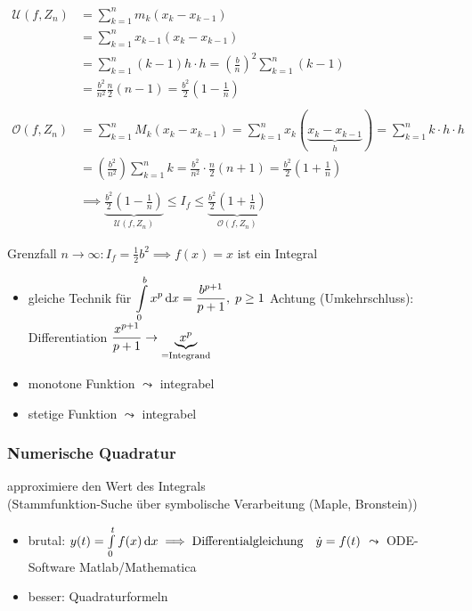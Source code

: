 \begin{align*}
	\mathcal U(f,Z_n) 
	&= \sum_{k=1}^n m_k(x_k-x_{k-1}) \\
	&= \sum_{k=1}^n x_{k-1}(x_k-x_{k-1}) \\
	&= \sum_{k=1}^n (k-1)h \cdot h = \left( \frac{b}{n} \right)^2 \sum_{k=1}^n (k-1) \\
	&= \frac{b^2}{n^2} \frac{n}{2}(n-1) = \frac{b^2}{2}\left(1-\frac{1}{n}\right) \\
	\\
	\mathcal O(f,Z_n)
	&=\sum_{k=1}^n M_k(x_k-x_{k-1}) = \sum_{k=1}^n x_k(\underbrace{x_k-x_{k-1}}_{h}) = \sum_{k=1}^n k \cdot h \cdot h \\
	&= \left(\frac{b^2}{n^2}\right)\sum_{k=1}^n k = \frac{b^2}{n^2} \cdot \frac{n}{2}(n+1) = \frac{b^2}{2}\left(1+\frac{1}{n}\right) \\
	\\
	&\implies \underbrace{ \frac{b^2}{2}\left(1-\frac{1}{n}\right) }_{\mathcal U(f,Z_n)}\leq I_f \leq \underbrace{\frac{b^2}{2}\left(1+\frac{1}{n}\right)}_{\mathcal O(f,Z_n)}
\end{align*}

\noindent Grenzfall \( n \rightarrow \infty : I_f = \frac{1}{2}b^2 \implies f(x) = x \) ist ein Integral

\begin{note}
	\begin{itemize}
		\item gleiche Technik für \( \displaystyle\int\limits_0^b x^p\,\mathrm{d}x= \frac{b^{p+1}}{p+1}, \;p \geq 1 \)
		\newline Achtung (Umkehrschluss): Differentiation \( \displaystyle\frac{x^{p+1}}{p+1} \rightarrow \underbrace{x^p}_{=\text{Integrand}} \)
		\item monotone Funktion \( \leadsto \) integrabel
		\item stetige Funktion \( \leadsto \) integrabel
	\end{itemize}	
\end{note} 

\subsubsection*{Numerische Quadratur}
approximiere den Wert des Integrals\\
(Stammfunktion-Suche über symbolische Verarbeitung (Maple, Bronstein))

\begin{itemize}
	\item brutal: \( y(t) = \int\limits_0^t f(x) \,\mathrm d x \implies \text{Differentialgleichung} \quad \dot{y} = f(t) \) \newline \( \leadsto \) ODE-Software Matlab/Mathematica
	\item besser: Quadraturformeln
\end{itemize}

